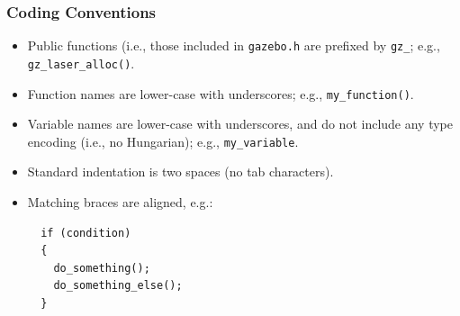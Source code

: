\documentclass[11pt]{report}
\begin{document}
\subsubsection{Coding Conventions}

\begin{itemize}
\item Public functions (i.e., those included in {\tt gazebo.h} are
prefixed by {\tt gz\_}; e.g., {\tt gz\_laser\_alloc()}.
\item Function names are lower-case with underscores; e.g., {\tt my\_function()}.
\item Variable names are lower-case with underscores, and do not
include any type encoding (i.e., no Hungarian); e.g., {\tt my\_variable}.
\item Standard indentation is two spaces (no tab characters).
\item Matching braces are aligned, e.g.:
  \begin{verbatim}
  if (condition)
  {
    do_something();
    do_something_else();
  }
  \end{verbatim}
\end{itemize}
\end{document}
